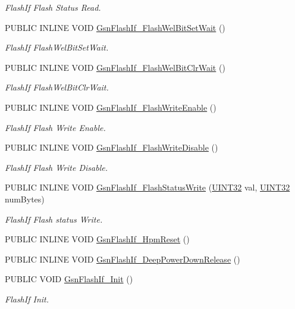 \begin{DoxyCompactItemize}
\begin{DoxyCompactList}\small\item\em FlashIf Flash Status Read. \end{DoxyCompactList}\item 
PUBLIC INLINE VOID \hyperlink{a00647_gaa4154e89e9e4a898ea3201fe01399563}{GsnFlashIf\_\-FlashWelBitSetWait} ()
\begin{DoxyCompactList}\small\item\em FlashIf FlashWelBitSetWait. \end{DoxyCompactList}\item 
PUBLIC INLINE VOID \hyperlink{a00647_gacbb20c31b55b63691495359dad00ccc6}{GsnFlashIf\_\-FlashWelBitClrWait} ()
\begin{DoxyCompactList}\small\item\em FlashIf FlashWelBitClrWait. \end{DoxyCompactList}\item 
PUBLIC INLINE VOID \hyperlink{a00647_ga73f637bd9c4acf82825974b750102043}{GsnFlashIf\_\-FlashWriteEnable} ()
\begin{DoxyCompactList}\small\item\em FlashIf Flash Write Enable. \end{DoxyCompactList}\item 
PUBLIC INLINE VOID \hyperlink{a00647_gaa765eb6f46ca5e3787deb574e035a43b}{GsnFlashIf\_\-FlashWriteDisable} ()
\begin{DoxyCompactList}\small\item\em FlashIf Flash Write Disable. \end{DoxyCompactList}\item 
PUBLIC INLINE VOID \hyperlink{a00647_ga3a7eea5fe3bb3b96a573037b355c0c0e}{GsnFlashIf\_\-FlashStatusWrite} (\hyperlink{a00660_gae1e6edbbc26d6fbc71a90190d0266018}{UINT32} val, \hyperlink{a00660_gae1e6edbbc26d6fbc71a90190d0266018}{UINT32} numBytes)
\begin{DoxyCompactList}\small\item\em FlashIf Flash status Write. \end{DoxyCompactList}\item 
PUBLIC INLINE VOID \hyperlink{a00501_a7d415448cd70cacfddca202e24c4bb23}{GsnFlashIf\_\-HpmReset} ()
\item 
PUBLIC INLINE VOID \hyperlink{a00501_a388105cd1800d0506f951250cf7354e9}{GsnFlashIf\_\-DeepPowerDownRelease} ()
\item 
PUBLIC VOID \hyperlink{a00647_gaca0cbeb5224273baff05b9bb8f18f28f}{GsnFlashIf\_\-Init} ()
\begin{DoxyCompactList}\small\item\em FlashIf Init. \end{DoxyCompactList}\item 

\end{DoxyCompactItemize}
